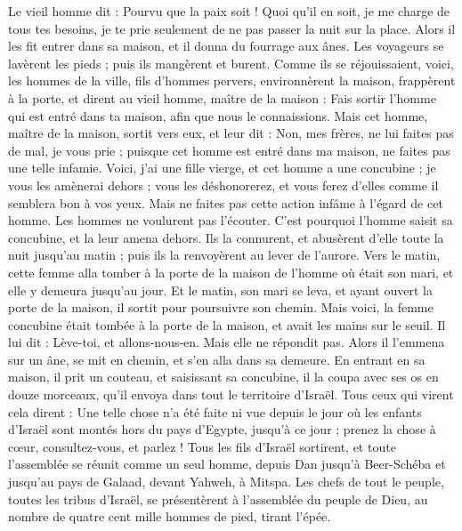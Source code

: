 \begin{multicols}{2}
Le vieil homme dit : Pourvu que la paix soit ! Quoi qu'il en soit, je me charge de tous tes besoins, je te prie seulement de ne pas passer la nuit sur la place.
Alors il les fit entrer dans sa maison, et il donna du fourrage aux ânes. Les voyageurs se lavèrent les pieds ; puis ils mangèrent et burent.
Comme ils se réjouissaient, voici, les hommes de la ville, fils d'hommes pervers, environnèrent la maison, frappèrent à la porte, et dirent au vieil homme, maître de la maison : Fais sortir l'homme qui est entré dans ta maison, afin que nous le connaissions.
Mais cet homme, maître de la maison, sortit vers eux, et leur dit : Non, mes frères, ne lui faites pas de mal, je vous prie ; puisque cet homme est entré dans ma maison, ne faites pas une telle infamie.
Voici, j'ai une fille vierge, et cet homme a une concubine ; je vous les amènerai dehors ; vous les déshonorerez, et vous ferez d'elles comme il semblera bon à vos yeux. Mais ne faites pas cette action infâme à l'égard de cet homme.
Les hommes ne voulurent pas l'écouter. C'est pourquoi l'homme saisit sa concubine, et la leur amena dehors. Ils la connurent, et abusèrent d'elle toute la nuit jusqu'au matin ; puis ils la renvoyèrent au lever de l'aurore.
Vers le matin, cette femme alla tomber à la porte de la maison de l'homme où était son mari, et elle y demeura jusqu'au jour.
Et le matin, son mari se leva, et ayant ouvert la porte de la maison, il sortit pour poursuivre son chemin. Mais voici, la femme concubine était tombée à la porte de la maison, et avait les mains sur le seuil.
Il lui dit : Lève-toi, et allons-nous-en. Mais elle ne répondit pas. Alors il l'emmena sur un âne, se mit en chemin, et s'en alla dans sa demeure.
En entrant en sa maison, il prit un couteau, et saisissant sa concubine, il la coupa avec ses os en douze morceaux, qu'il envoya dans tout le territoire d'Israël.
Tous ceux qui virent cela dirent : Une telle chose n'a été faite ni vue depuis le jour où les enfants d'Israël sont montés hors du pays d'Egypte, jusqu'à ce jour ; prenez la chose à cœur, consultez-vous, et parlez !
\VerseOne{}Tous les fils d'Israël sortirent, et toute l'assemblée se réunit comme un seul homme, depuis Dan jusqu'à Beer-Schéba et jusqu'au pays de Galaad, devant Yahweh, à Mitspa.
Les chefs de tout le peuple, toutes les tribus d'Israël, se présentèrent à l'assemblée du peuple de Dieu, au nombre de quatre cent mille hommes de pied, tirant l'épée.

\end{multicols}
